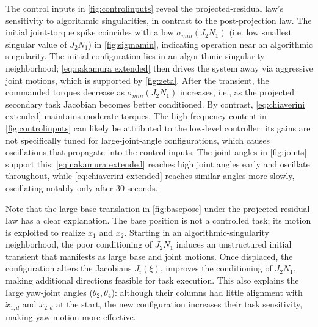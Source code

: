 \documentclass[../main.tex]{subfiles}
\begin{document}
The control inputs in \cref{fig:controlinputs} reveal the projected-residual law's sensitivity to algorithmic singularities, in contrast to the post-projection law. The initial joint-torque spike coincides with a low \( \sigma_{min}(J_2N_1) \) (i.e. low smallest singular value of \(J_2N_1\)) in \cref{fig:sigmamin}, indicating operation near an algorithmic singularity. The initial configuration lies in an algorithmic-singularity neighborhood; \eqref{eq:nakamura extended} then drives the system away via aggressive joint motions, which is supported by \cref{fig:zeta}. After the transient, the commanded torques decrease as \( \sigma_{min}(J_2N_1) \) increases, i.e., as the projected secondary task Jacobian becomes better conditioned. By contrast, \eqref{eq:chiaverini extended} maintains moderate torques. The high-frequency content in \cref{fig:controlinputs} can likely be attributed to the low-level controller: its gains are not specifically tuned for large-joint-angle configurations, which causes oscillations that propagate into the control inputs. The joint angles in \cref{fig:joints} support this: \eqref{eq:nakamura extended} reaches high joint angles early and oscillate throughout, while \eqref{eq:chiaverini extended} reaches similar angles more slowly, oscillating notably only after 30 seconds.


Note that the large base translation in \cref{fig:basepose} under the projected-residual law has a clear explanation. The base position is not a controlled task; its motion is exploited to realize \(x_1\) and \(x_2\). Starting in an algorithmic-singularity neighborhood, the poor conditioning of \( J_2N_1 \) induces an unstructured initial transient that manifests as large base and joint motions. Once displaced, the configuration alters the Jacobians \( J_i(\xi) \), improves the conditioning of \( J_2N_1 \), making additional directions feasible for task execution. This also explains the large yaw-joint angles (\( \theta_2,\theta_4 \)): although their columns had little alignment with \( \dot{x}_{1,d} \) and \( \dot{x}_{2,d} \) at the start, the new configuration increases their task sensitivity, making yaw motion more effective.
\end{document}
